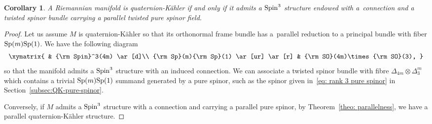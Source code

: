\documentclass[pdftex]{sigma}
\numberwithin{equation}{section}
\newtheorem{Corollary}[Theorem]{Corollary}
\begin{document}
\begin{Corollary} A Riemannian manifold is quaternion-K\"ahler if and only if it admits a ${\rm Spin}^3$ structure endowed with a~connection and a twisted spinor bundle carrying a parallel twisted pure spinor field.
\end{Corollary}
\begin{proof} Let us assume $M$ is quaternion-K\"ahler so that its orthonormal frame bundle has a~parallel reduction to a principal bundle with fiber ${\rm Sp}(m){\rm Sp}(1)$. We have the following diagram
\begin{gather*}
\xymatrix{
 & {\rm Spin}^3(4m) \ar[d]\\
{\rm Sp}(m){\rm Sp}(1) \ar[ur] \ar[r] & {\rm SO}(4m)\times {\rm SO}(3),
}
\end{gather*}
so that the manifold admits a ${\rm Spin}^3$ structure with an induced connection. We can associate a twisted spinor bundle with fibre $\Delta_{4m}\otimes \Delta_3^{m}$ which contains a trivial ${\rm Sp}(m){\rm Sp}(1)$ summand generated by a pure spinor, such as the spinor given in~\eqref{eq: rank 3 pure spinor} in Section~\ref{subsec:QK-pure-spinor}.

Conversely, if $M$ admits a ${\rm Spin}^3$ structure with a connection and carrying a parallel pure spinor, by Theorem~\ref{theo: parallelness}, we have a parallel quaternion-K\"ahler structure.
\end{proof}
\end{document}
